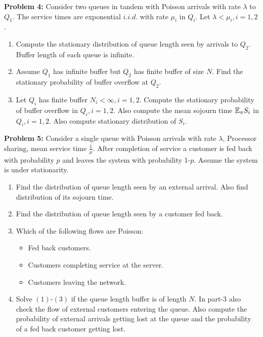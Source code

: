 \documentclass[all-lectures.tex]{subfiles}
\begin{document}
\noindent \textbf{Problem 4:} Consider two queues in tandem with Poisson arrivals with rate $\lambda$ to $Q_1$.  The service times are exponential $i.i.d.$ with rate $\mu_i$ in $Q_i$. Let $\lambda < \mu_i, i=1,2$.
\begin{enumerate} 
\item Compute the stationary distribution of queue length seen by arrivals to $Q_2$. Buffer length of each queue is infinite.
\item Assume $Q_1$ has infinite buffer but $Q_2$ has finite buffer of size $N$. 
Find the stationary probability of buffer overflow at $Q_2$. 
\item Let $Q_i$ has finite buffer $N_i<\infty, i=1,2$. 
Compute the stationary probability of buffer overflow in $Q_i, i=1,2$. 
Also compute the mean sojourn time $\mathbb{E}_{\pi}{S_i}$ in $Q_i,i=1,2$. 
Also compute stationary distribution of $S_i$.
\end{enumerate}


\noindent \textbf{Problem 5:}
Consider a single queue with Poisson arrivals with rate $\lambda$, Processor sharing, mean service time $\frac{1}{\mu}$.
After completion of service a customer is fed back with probability $p$ and leaves the system with probability 1-$p$.
Assume the system is under stationarity.
\begin{enumerate}
\item Find the distribution of queue length seen by an external arrival.
Also find distribution of its sojourn time.
\item Find the distribution of queue length seen by a customer fed back.
\item Which of the following flows are Poisson:
\begin{itemize}
\item Fed back customers.
\item Customers completing service at the server.
\item Customers leaving the network.
\end{itemize}
\item Solve $(1)$-$(3)$ if the queue length buffer is of length $N$.
In part-$3$ also check the flow of external customers entering the queue.
Also compute the probability of external arrivals getting lost at the queue and the probability of a fed back customer getting lost.
\end{enumerate}
\end{document}
